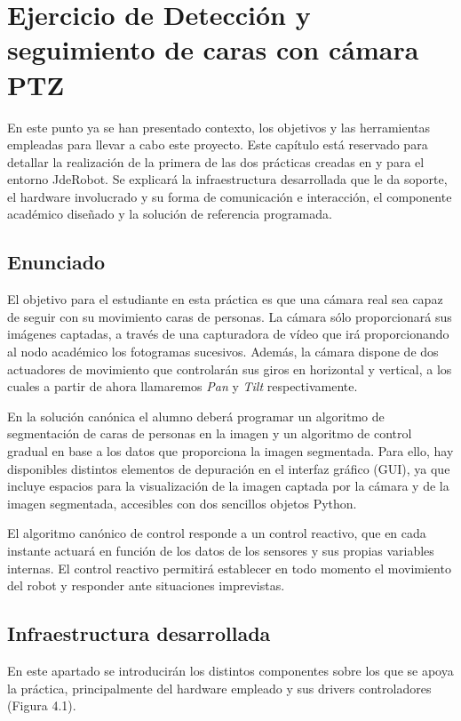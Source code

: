\chapter{Ejercicio de Detección y seguimiento de caras con cámara PTZ}\label{cap.followface}
En este punto ya se han presentado contexto, los objetivos y las herramientas empleadas para llevar a cabo este proyecto. Este capítulo está reservado para detallar la realización de la primera de las dos prácticas creadas en y para el entorno JdeRobot. Se explicará la infraestructura desarrollada que le da soporte, el hardware involucrado y su forma de comunicación e interacción, el componente académico diseñado y la solución de referencia programada.

\section{Enunciado} \label{sec.enunciado}
El objetivo para el estudiante en esta práctica es que una cámara real sea capaz de seguir con su movimiento caras de personas. La cámara sólo proporcionará sus imágenes captadas, a través de una capturadora de vídeo que irá proporcionando al nodo académico los fotogramas sucesivos. Además, la cámara dispone de dos actuadores de movimiento que controlarán sus giros en horizontal y vertical, a los cuales a partir de ahora llamaremos \textit{Pan} y \textit{Tilt} respectivamente.

En la solución canónica el alumno deberá programar un algoritmo de segmentación de caras de personas en la imagen y un algoritmo de control gradual en base a los datos que proporciona la imagen segmentada. Para ello, hay disponibles distintos elementos de depuración en el interfaz gráfico (GUI), ya que incluye espacios para la visualización de la imagen captada por la cámara y de la imagen segmentada, accesibles con dos sencillos objetos Python.

El algoritmo canónico de control responde a un control reactivo, que en cada instante actuará en función de los datos de los sensores y sus propias variables internas. El control reactivo permitirá establecer en todo momento el movimiento del robot y responder ante situaciones imprevistas.

\section{Infraestructura desarrollada}
En este apartado se introducirán los distintos componentes sobre los que se apoya la práctica, principalmente del hardware empleado y sus drivers controladores (Figura 4.1).

